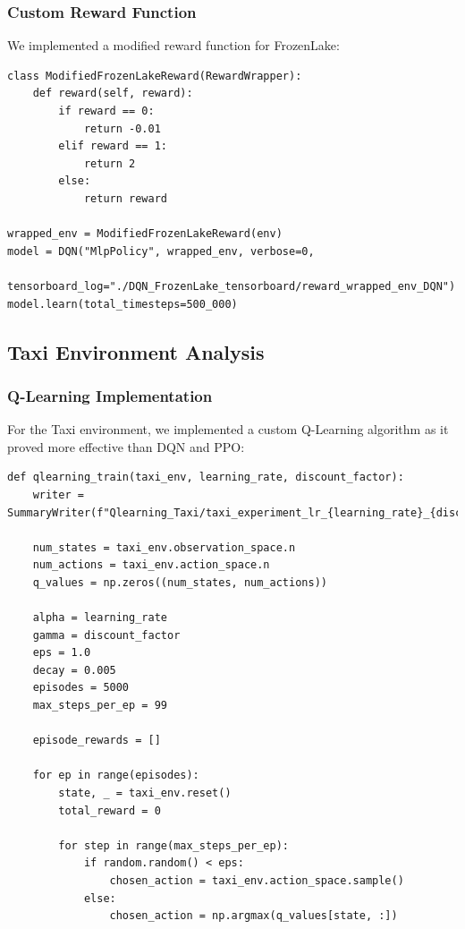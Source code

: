 \documentclass[12pt]{article}
\begin{document}
{{{\subsubsection{Custom Reward Function}

We implemented a modified reward function for FrozenLake:

\begin{verbatim}
class ModifiedFrozenLakeReward(RewardWrapper):
    def reward(self, reward):
        if reward == 0:            
            return -0.01
        elif reward == 1:           
            return 2
        else:
            return reward

wrapped_env = ModifiedFrozenLakeReward(env)
model = DQN("MlpPolicy", wrapped_env, verbose=0, 
           tensorboard_log="./DQN_FrozenLake_tensorboard/reward_wrapped_env_DQN")
model.learn(total_timesteps=500_000)
\end{verbatim}

\subsection{Taxi Environment Analysis}

\subsubsection{Q-Learning Implementation}

For the Taxi environment, we implemented a custom Q-Learning algorithm as it proved more effective than DQN and PPO:

\begin{verbatim}
def qlearning_train(taxi_env, learning_rate, discount_factor):
    writer = SummaryWriter(f"Qlearning_Taxi/taxi_experiment_lr_{learning_rate}_{discount_factor}")
    
    num_states = taxi_env.observation_space.n
    num_actions = taxi_env.action_space.n
    q_values = np.zeros((num_states, num_actions))
    
    alpha = learning_rate
    gamma = discount_factor
    eps = 1.0
    decay = 0.005
    episodes = 5000
    max_steps_per_ep = 99
    
    episode_rewards = []
    
    for ep in range(episodes):
        state, _ = taxi_env.reset()
        total_reward = 0
    
        for step in range(max_steps_per_ep):
            if random.random() < eps:
                chosen_action = taxi_env.action_space.sample()
            else:
                chosen_action = np.argmax(q_values[state, :])
            

\end{verbatim}}}}
\end{document}
